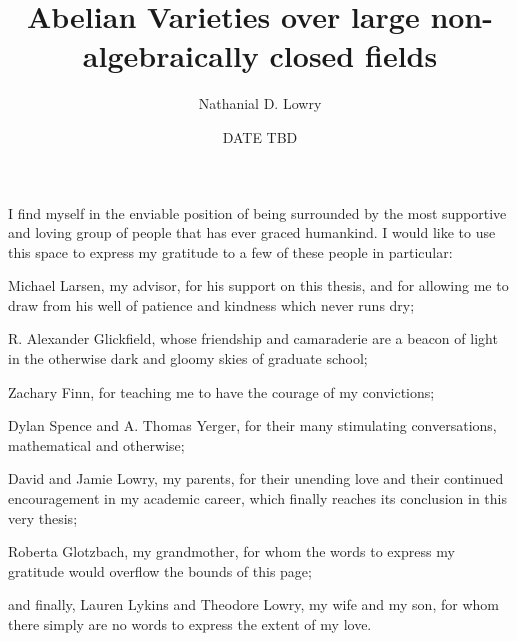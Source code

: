 \documentclass[showabstract,showacknowledgments,showpreface,showdedication,12pt]{iuphd}
\title{Abelian Varieties over large non-algebraically closed fields}
\author{Nathanial D. Lowry}
\date{DATE TBD} %
\begin{document}
\maketitle
\acceptancepage




\begin{acknowledgements}
I find myself in the enviable position of being surrounded by the most supportive and loving group of people that has ever graced humankind. I would like to use this space to express my gratitude to a few of these people in particular:

Michael Larsen, my advisor, for his support on this thesis, and for allowing me to draw from his well of patience and kindness which never runs dry;

R. Alexander Glickfield, whose friendship and camaraderie are a beacon of light in the otherwise dark and gloomy skies of graduate school;

Zachary Finn, for teaching me to have the courage of my convictions;

Dylan Spence and A. Thomas Yerger, for their many stimulating conversations, mathematical and otherwise;

David and Jamie Lowry, my parents, for their unending love and their continued encouragement in my academic career, which finally reaches its conclusion in this very thesis;

Roberta Glotzbach, my grandmother, for whom the words to express my gratitude would overflow the bounds of this page;

and finally, Lauren Lykins and Theodore Lowry, my wife and my son, for whom there simply are no words to express the extent of my love.
\end{acknowledgements}




\end{document}
